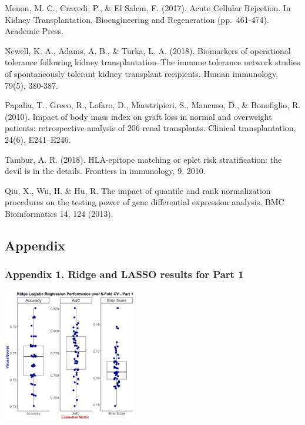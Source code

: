 \documentclass[a4paper,9pt,twocolumn,twoside,]{pinp}
\begin{document}
Menon, M. C., Cravedi, P., \& El Salem, F. (2017). Acute Cellular
Rejection. In Kidney Transplantation, Bioengineering and Regeneration
(pp.~461-474). Academic Press.

Newell, K. A., Adams, A. B., \& Turka, L. A. (2018). Biomarkers of
operational tolerance following kidney transplantation--The immune
tolerance network studies of spontaneously tolerant kidney transplant
recipients. Human immunology, 79(5), 380-387.

Papalia, T., Greco, R., Lofaro, D., Maestripieri, S., Mancuso, D., \&
Bonofiglio, R. (2010). Impact of body mass index on graft loss in normal
and overweight patients: retrospective analysis of 206 renal
transplants. Clinical transplantation, 24(6), E241--E246.

Tambur, A. R. (2018). HLA-epitope matching or eplet risk stratification:
the devil is in the details. Frontiers in immunology, 9, 2010.

Qiu, X., Wu, H. \& Hu, R. The impact of quantile and rank normalization
procedures on the testing power of gene differential expression
analysis. BMC Bioinformatics 14, 124 (2013).

\newpage
\newpage

\hypertarget{appendix}{%
\subsection{Appendix}\label{appendix}}

\hypertarget{appendix-1.-ridge-and-lasso-results-for-part-1}{%
\subsubsection{Appendix 1. Ridge and LASSO results for Part
1}\label{appendix-1.-ridge-and-lasso-results-for-part-1}}

\begin{center}\includegraphics[width=220px]{images/part1ridge} \end{center}
\end{document}
